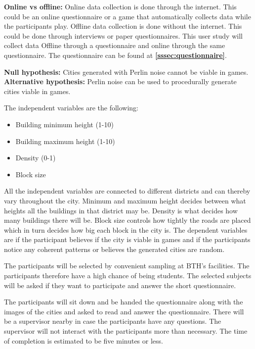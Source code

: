 		\textbf{Online vs offline: }
		Online data collection is done through the internet. This could be an online questionnaire or a game that automatically collects data while the participants play. Offline data collection is done without the internet. This could be done through interviews or paper questionnaires. This user study will collect data Offline through a questionnaire and online through the same questionnaire. The questionnaire can be found at \textbf{\ref{sssec:questionnaire}}.
		
		\textbf{Null hypothesis:} Cities generated with Perlin noise cannot be viable in games.
		\textbf{Alternative hypothesis:} Perlin noise can be used to procedurally generate cities viable in games.
		
		The independent variables are the following:
		\begin{itemize}
			\item Building minimum height (1-10)
			\item Building maximum height (1-10)
			\item Density (0-1)
			\item Block size
		\end{itemize}
		All the independent variables are connected to different districts and can thereby vary throughout the city. Minimum and maximum height decides between what heights all the buildings in that district may be. Density is what decides how many buildings there will be. Block size controls how tightly the roads are placed which in turn decides how big each block in the city is.
		The dependent variables are if the participant believes if the city is viable in games and if the participants notice any coherent patterns or believes the generated cities are random.
		
		The participants will be selected by convenient sampling at BTH’s facilities. The participants therefore have a high chance of being students. The selected subjects will be asked if they want to participate and answer the short questionnaire.
		
		The participants will sit down and be handed the questionnaire along with the images of the cities and asked to read and answer the questionnaire. There will be a supervisor nearby in case the participants have any questions. The supervisor will not interact with the participants more than necessary.  The time of completion is estimated to be five minutes or less.
		
